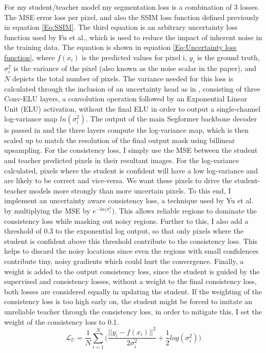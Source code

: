 \documentclass[11pt]{ociamthesis}  %
\begin{document}
For my student/teacher model my segmentation loss is a combination of 3 losses. The MSE error loss per pixel, and also the SSIM loss function defined previously in equation \ref{Eq:SSIM}. The third equation is an arbitrary uncertainty loss function used by Fu et al.\cite{fu2024uncertainty}, which is used to reduce the impact of inherent noise in the training data. The equation is shown in equation \ref{Eq:Uncertainty loss function}, where $f(x_i)$ is the predicted values for pixel i, $y_i$ is the ground truth, $\sigma_i^2$ is the variance of the pixel (also known as the noise scalar in the paper), and $N$ depicts the total number of pixels. The variance needed for this loss is calculated through the inclusion of an uncertainty head as in \cite{fu2024uncertainty}, consisting of three Conv-ELU layers, a convolution operation followed by an Exponential Linear Unit (ELU) activation, without the final ELU in order to output a single-channel log-variance map $ln(\sigma_i^2)$. The output of the main Segformer backbone decoder is passed in and the three layers compute the log-variance map, which is then scaled up to match the resolution of the final output mask using billinear upsampling. For the consistency loss, I simply use the MSE between the student and teacher predicted pixels in their resultant images. For the log-variance calculated, pixels where the student is confident will have a low log-variance and are likely to be correct and vice-versa. We want these pixels to drive the student-teacher models more strongly than more uncertain pixels. To this end, I implement an uncertainty aware consistency loss, a technique used by Yu et al.\cite{yu2019uncertainty} by multiplying the MSE by $e^{-ln(\sigma_i^2})$. This allows reliable regions to dominate the consistency loss while masking out noisy regions. Further to this, I also add a threshold of 0.3 to the exponential log output, so that only pixels where the student is confident above this threshold contribute to the consistency loss. This helps to discard the noisy locations since even the regions with small confidences contribute tiny, noisy gradients which could hurt the convergence. Finally, a weight is added to the output consistency loss, since the student is guided by the supervised and consistency losses, without a weight to the final consistency loss, both losses are considered equally  in updating the student. If the weighting of the consistency loss is too high early on, the student might be forced to imitate an unreliable teacher through the consistency loss, in order to mitigate this, I set the weight of the consistency loss to 0.1. 
\noindent
\begin{equation}
    \mathcal{L}_U = \frac{1}{N}\sum_{i =1}^{N}\Biggr(\frac{||y_i - f(x_i)||^2}{2\sigma_i^2} + \frac{1}{2} log(\sigma_i^2)\Biggr)
    \label{Eq:Uncertainty loss function}
\end{equation}
\end{document}
